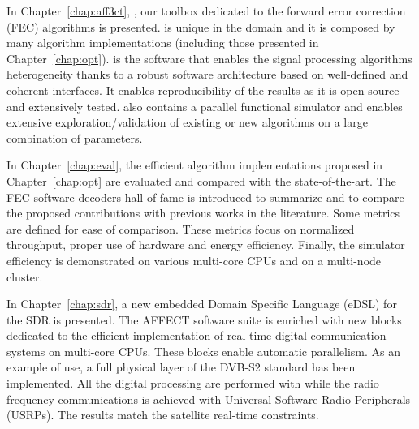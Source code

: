In Chapter~\ref{chap:aff3ct}, \AFFECT, our toolbox dedicated to the forward
error correction (FEC) algorithms is presented. \AFFECT is unique in the domain
and it is composed by many algorithm implementations (including those presented
in Chapter~\ref{chap:opt}). \AFFECT is the software that enables the signal
processing algorithms heterogeneity thanks to a robust software architecture
based on well-defined and coherent interfaces. It enables reproducibility of the
results as it is open-source and extensively tested. \AFFECT also contains a
parallel functional simulator and enables extensive exploration/validation of
existing or new algorithms on a large combination of parameters.

In Chapter~\ref{chap:eval}, the efficient algorithm implementations proposed
in Chapter~\ref{chap:opt} are evaluated and compared with the state-of-the-art.
The FEC software decoders hall of fame is introduced to summarize and to compare
the proposed contributions with previous works in the literature. Some metrics
are defined for ease of comparison. These metrics focus on normalized
throughput, proper use of hardware and energy efficiency. Finally, the \AFFECT
simulator efficiency is demonstrated on various multi-core CPUs and on a
multi-node cluster.

In Chapter~\ref{chap:sdr}, a new embedded Domain Specific Language (eDSL) for
the SDR is presented. The AFFECT software suite is enriched with new blocks
dedicated to the efficient implementation of real-time digital communication
systems on multi-core CPUs. These blocks enable automatic parallelism. As an
example of use, a full physical layer of the DVB-S2 standard has been
implemented. All the digital processing are performed with \AFFECT while the
radio frequency communications is achieved with Universal Software Radio
Peripherals (USRPs). The results match the satellite real-time constraints.
